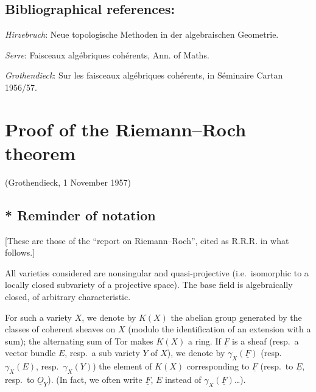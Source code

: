 %
\subsection*{Bibliographical references:}
\begin{enumerate}[label={[\arabic*]}]
\item \emph{Hirzebruch}: Neue topologische Methoden in der algebraischen Geometrie.
\item \emph{Serre}: Faisceaux algébriques cohérents, Ann. of Maths.
\item \emph{Grothendieck}: Sur les faisceaux algébriques cohérents, in Séminaire Cartan 1956/57.
\end{enumerate}

\section*{Proof of the Riemann--Roch theorem}
\begin{center}
(Grothendieck, 1 November 1957)
\end{center}

\subsection*{* Reminder of notation}
[These are those of the ``report on Riemann--Roch'', cited as R.R.R. in what follows.]

All varieties considered are nonsingular and quasi-projective (i.e.\ isomorphic to a locally closed subvariety of a projective space). The base field is algebraically closed, of arbitrary characteristic.

For such a variety \(X\), we denote by \(K(X)\) the abelian group generated by the classes of coherent sheaves on \(X\) (modulo the identification of an extension with a sum); the alternating sum of Tor makes \(K(X)\) a ring. If \(\underline F\) is a sheaf (resp.\ a vector bundle \(E\), resp.\ a sub%
%
variety \(Y\) of \(X\)), we denote by \(\gamma_X(\underline F)\) (resp.\ \(\gamma_X(E)\), resp.\ \(\gamma_X(Y)\)) the element of \(K(X)\) corresponding to \(\underline F\) (resp.\ to \(\underline E\), resp.\ to \(\underline{O}_Y\)). (In fact, we often write \(\underline F\), \(E\) instead of \(\gamma_X(\underline F)\)\dots).

